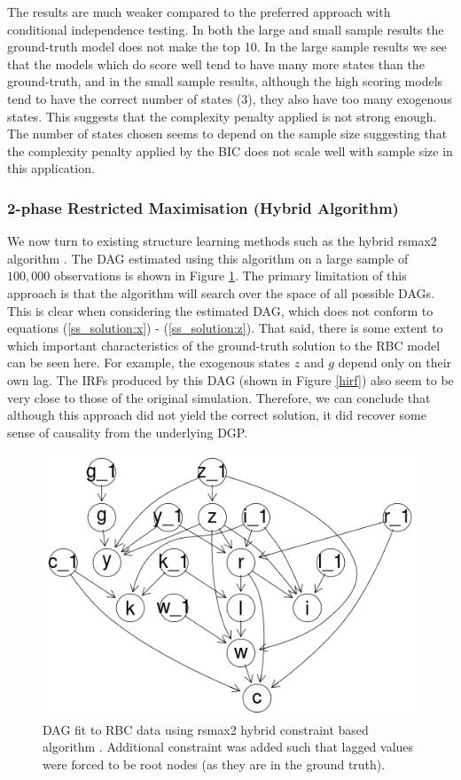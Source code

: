 \documentclass{article}
\begin{document}
The results are much weaker compared to the preferred approach with conditional independence testing. In both the large and small sample results the ground-truth model does not make the top 10. In the large sample results we see that the models which do score well tend to have many more states than the ground-truth, and in the small sample results, although the high scoring models tend to have the correct number of states (3), they also have too many exogenous states. This suggests that the complexity penalty applied is not strong enough. The number of states chosen seems to depend on the sample size suggesting that the complexity penalty applied by the BIC does not scale well with sample size in this application.  

\subsubsection{2-phase Restricted Maximisation (Hybrid Algorithm)} \label{rsmax2}

We now turn to existing structure learning methods such as the hybrid rsmax2 algorithm \parencite{scutari2014multiple}. The DAG estimated using this algorithm on a large sample of $100,000$ observations is shown in Figure \ref{hdag}. The primary limitation of this approach is that the algorithm will search over the space of all possible DAGs. This is clear when considering the estimated DAG, which does not conform to equations (\ref{ss_solution:x}) - (\ref{ss_solution:z}). That said, there is some extent to which important characteristics of the ground-truth solution to the RBC model can be seen here. For example, the exogenous states $z$ and $g$ depend only on their own lag. The IRFs produced by this DAG (shown in Figure \ref{hirf}) also seem to be very close to those of the original simulation. Therefore, we can conclude that although this approach did not yield the correct solution, it did recover some sense of causality from the underlying DGP.

\begin{figure}
  \centering  
  \includegraphics[width=0.6\linewidth]{images/rbc_hybrid_dag.png}
  \caption{DAG fit to RBC data using rsmax2 hybrid constraint based algorithm \parencite{scutari2014multiple}. Additional constraint was added such that lagged values were forced to be root nodes (as they are in the ground truth).}
  \label{hdag}
\end{figure}
\end{document}
